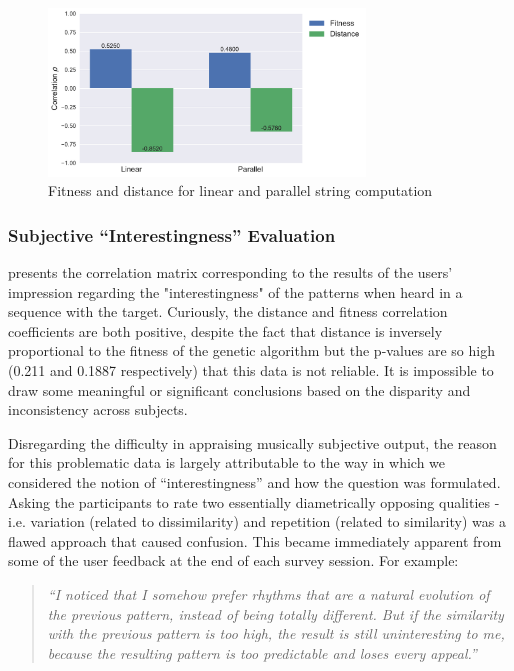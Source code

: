 {{\begin{figure}
	\begin{center}
		\includegraphics[width=0.75\textwidth]{ch03_symbolic/figures/reps_bar.pdf}
	\end{center}
	\caption[Fitness and distance for linear and parallel string computation]{Fitness and distance for linear and parallel string computation}
	\label{fig:linear_versus_parallel}
\end{figure}


\subsubsection{Subjective “Interestingness” Evaluation}

 presents the correlation matrix corresponding to the results of the users' impression regarding the "interestingness" of the patterns when heard in a sequence with the target. Curiously, the distance and fitness correlation coefficients are both positive, despite the fact that distance is inversely proportional to the fitness of the genetic algorithm but the p-values are so high (0.211 and 0.1887 respectively) that this data is not reliable. It is impossible to draw some meaningful or significant conclusions based on the disparity and inconsistency across subjects.

Disregarding the difficulty in appraising musically subjective output, the reason for this problematic data is largely attributable to the way in which we considered the notion of ``interestingness'' and how the question was formulated. Asking the participants to rate two essentially diametrically opposing qualities - i.e. variation (related to dissimilarity) and repetition (related to similarity) was a flawed approach that caused confusion. This became immediately apparent from some of the user feedback at the end of each survey session. For example:

\blockquote{\textit{“I noticed that I somehow prefer rhythms that are a natural
evolution of the previous pattern, instead of being totally different. But if the similarity with the previous pattern is too high, the result is still uninteresting to me, because the resulting pattern is too predictable and loses every appeal.”}}

}}
